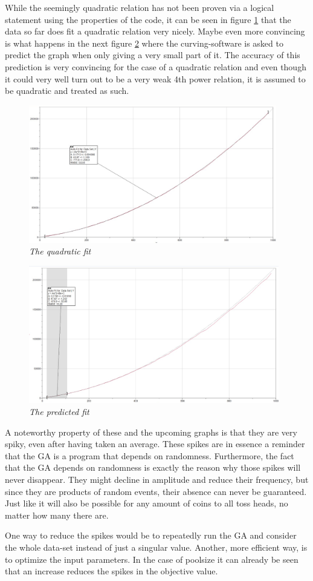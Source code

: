\par
While the seemingly quadratic relation has not been proven via a logical statement using the properties of the code, it can be seen in figure \ref{LPPC} that the data so far does fit a quadratic relation very nicely. Maybe even more convincing is what happens in the next figure \ref{LPPP} where the curving-software is asked to predict the graph when only giving a very small part of it. The accuracy of this prediction is very convincing for the case of a quadratic relation and even though it could very well turn out to be a very weak 4th power relation, it is assumed to be quadratic and treated as such.

\begin{figure}[h] 
\centering
\includegraphics[height=6cm]{LPPC}
\caption{\textsl{The quadratic fit}}
\label{LPPC}
\end{figure}

\begin{figure}[h] 
\centering
\includegraphics[height=6cm]{LPPP}
\caption{\textsl{The predicted fit}}
\label{LPPP}
\end{figure}

\par
A noteworthy property of these and the upcoming graphs is that they are very spiky, even after having taken an average. These spikes are in essence a reminder that the GA is a program that depends on randomness. Furthermore, the fact that the GA depends on randomness is exactly the reason why those spikes will never disappear. They might decline in amplitude and reduce their frequency, but since they are products of random events, their absence can never be guaranteed. Just like it will also be possible for any amount of coins to all toss heads, no matter how many there are.
\par
One way to reduce the spikes would be to repeatedly run the GA and consider the whole data-set instead of just a singular value. Another, more efficient way, is to optimize the input parameters. In the case of poolsize it can already be seen that an increase reduces the spikes in the objective value.

